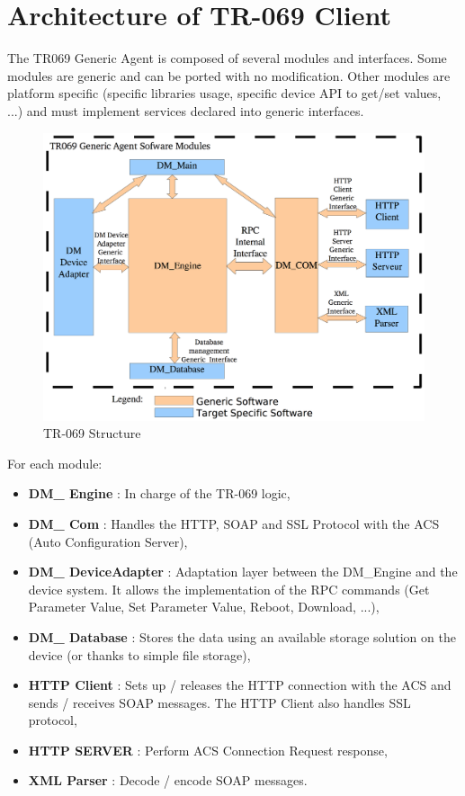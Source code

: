 \section{Architecture of TR-069 Client}
The TR069 Generic Agent is composed of several modules and interfaces. Some modules are generic and can be ported with no modification. Other modules are platform specific (specific libraries usage, specific device API to get/set values, ...) and must implement services declared into generic interfaces.

\begin{figure}[htbp]
	\centering
		\includegraphics[width=12cm]{Figures/structuretr069.png}
	\caption[TR-069 Structure]{TR-069 Structure}
	\label{fig:tr069}
\end{figure}

For each module:
\begin{itemize}
  \item \textbf{DM\_ Engine} : In charge of the TR-069 logic,
  \item \textbf{DM\_ Com} : Handles the HTTP, SOAP and SSL Protocol with the ACS (Auto Configuration Server),
  \item \textbf{DM\_ DeviceAdapter} : Adaptation layer between the DM_Engine and the device system. It allows the implementation of the RPC commands (Get Parameter Value, Set Parameter Value, Reboot, Download, ...),
  \item \textbf{DM\_ Database} : Stores the data using an available storage solution on the device (or thanks to simple file storage),
  \item \textbf{HTTP Client} : Sets up / releases the HTTP connection with the ACS and sends / receives SOAP messages. The HTTP Client also handles SSL protocol,
  \item \textbf{HTTP SERVER} : Perform ACS Connection Request response,
  \item \textbf{XML Parser} : Decode / encode SOAP messages.
\end{itemize}

